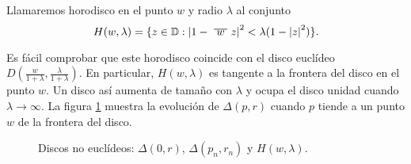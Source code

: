 \begin{definition}
    Llamaremos horodisco en el punto $w$ y radio $\lambda$ al conjunto
    \begin{equation*}
        H(w,\lambda) = \{z \in \disk : \abs{1 - \xbar{w} z}^2 < \lambda(1 - \abs{z}^2)\}.
    \end{equation*}
\end{definition}

Es fácil comprobar que este horodisco coincide con el disco euclídeo $D(\frac{w}{1+\lambda}, \frac{\lambda}{1+\lambda})$. En particular, $H(w, \lambda)$ es tangente a la frontera del disco en el punto $w$. Un disco así aumenta de tamaño con $\lambda$ y ocupa el disco unidad cuando $\lambda \to \infty$. La figura \ref{fig:noeuclideos} muestra la evolución de $\Delta(p,r)$ cuando $p$ tiende a un punto $w$ de la frontera del disco. \\

\begin{figure}[h]{}
    \begin{minipage}[h]{0.32\textwidth}
        \centering
        \label{fig:noeuclideo1}
    \end{minipage} \hfill
    \begin{minipage}[h]{0.32\textwidth}
        \label{fig:noeuclideo2}
    \end{minipage} \hfill
    \begin{minipage}[h]{0.32\textwidth}
        \label{fig:noeuclideo3}
    \end{minipage}
    \caption{Discos no euclídeos: $\Delta(0, r)$, $\Delta(p_n, r_n)$ y $H(w, \lambda)$.}
    \label{fig:noeuclideos}
\end{figure}


